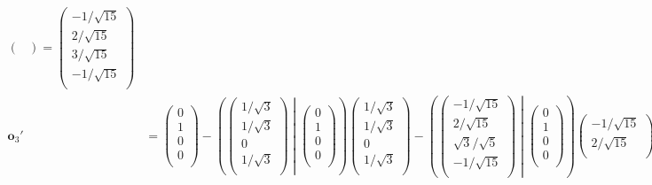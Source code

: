 \documentclass[dvipdfmx]{jsarticle}
\begin{document}
\begin{align*}
\begin{pmatrix}
\end{pmatrix} = \begin{pmatrix}
   - {1}/{\sqrt{15}} \\
  {2}/{\sqrt{15}} \\
  {3}/{\sqrt{15}} \\
   - {1}/{\sqrt{15}} \\
\end{pmatrix}\\
\mathbf{o}_{3}' &= \begin{pmatrix}
  0 \\
  1 \\
  0 \\
  0 \\
\end{pmatrix} - \left( \begin{pmatrix}
  {1}/{\sqrt{3}} \\
  {1}/{\sqrt{3}} \\
  0 \\
  {1}/{\sqrt{3}} \\
\end{pmatrix} \middle| \begin{pmatrix}
  0 \\
  1 \\
  0 \\
  0 \\
\end{pmatrix} \right)\begin{pmatrix}
  {1}/{\sqrt{3}} \\
  {1}/{\sqrt{3}} \\
  0 \\
  {1}/{\sqrt{3}} \\
\end{pmatrix} - \left( \begin{pmatrix}
   - {1}/{\sqrt{15}} \\
  {2}/{\sqrt{15}} \\
  {\sqrt{3}}/{\sqrt{5}} \\
   - {1}/{\sqrt{15}} \\
\end{pmatrix} \middle| \begin{pmatrix}
  0 \\
  1 \\
  0 \\
  0 \\
\end{pmatrix} \right)\begin{pmatrix}
   - {1}/{\sqrt{15}} \\
  {2}/{\sqrt{15}} \\

\end{pmatrix}
\end{align*}
\end{document}
